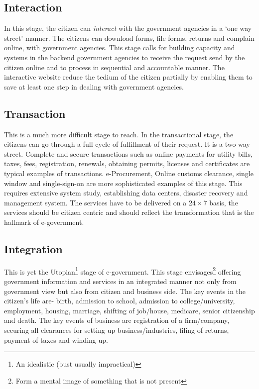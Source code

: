 \subsection{Interaction}
In this stage, the citizen can \textit{interact} with the government agencies in a ‘one way street’ manner. The citizens can download forms, file forms, returns and complain online, with government agencies. This stage calls for building capacity and systems in the backend government agencies to receive the request send by the
citizen online and to process in sequential and accountable manner. The interactive website reduce the tedium of the citizen partially by enabling them to save at least one step in dealing with government agencies.

\subsection{Transaction}
This is a much more difficult stage to reach. In the transactional stage, the citizens can go through a full cycle of fulfillment of their request. It is a two-way street.  Complete and secure transactions such as online payments for utility bills, taxes, fees, registration, renewals, obtaining permits, licenses and certificates are typical examples of transactions. e-Procurement, Online customs clearance, single window and single-sign-on are more sophisticated examples of this stage. This requires extensive system study, establishing data centers, disaster recovery and management system. The services have to be delivered on a $24\times7$ basis, the services should be citizen centric and should reflect the transformation that is the hallmark of e-government.

\subsection{Integration}
This is yet the Utopian\footnote{An idealistic (bust usually impractical)} stage of e-government. This stage envisages\footnote{Form a mental image of something that is not present} offering government information and services in an integrated manner not only from government view but also from citizen and business side. The key events in the citizen’s life are- birth, admission to school, admission to college/university, employment, housing, marriage, shifting of job/house, medicare, senior citizenship and death. The key events of business are registration of a firm/company, securing all clearances for setting up business/industries, filing of returns, payment of taxes and winding up.


